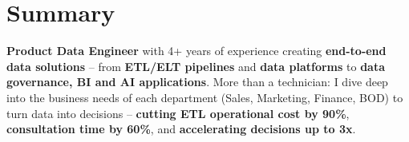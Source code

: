 
\section{Summary}
\textbf{Product Data Engineer} with 4+ years of experience creating \textbf{end-to-end data solutions} -- from \textbf{ETL/ELT pipelines} and \textbf{data platforms} to \textbf{data governance, BI and AI applications}. More than a technician: I dive deep into the business needs of each department (Sales, Marketing, Finance, BOD) to turn data into decisions -- \textbf{cutting ETL operational cost by 90\%}, \textbf{consultation time by 60\%}, and \textbf{accelerating decisions up to 3x}.
